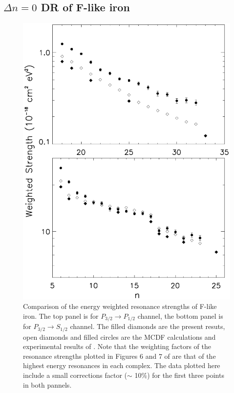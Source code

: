\documentclass{elsart}
\begin{document}
\subsection{$\Delta n = 0$ DR of F-like iron}
\begin{figure}
\includegraphics[width=5in]{str.eps}
\caption{\label{fig_str} Comparison of the energy weighted resonance
strengths of F-like iron. The top panel is for $P_{3/2}\to P_{1/2}$ channel,
the bottom 
panel is for $P_{3/2}\to S_{1/2}$ channel. The filled diamonds are the present
resuts, open diamonds and filled circles are the MCDF calculations and
experimental results of \citet{savin99}. Note that the weighting factors of
the resonance strengths plotted in Figures 6 and 7 of \citet{savin99} are that
of the highest energy resonances in each complex. The data plotted here
include a small corrections factor ($\sim$ 10\%) for the first three points in
both pannels.}
\end{figure}
\end{document}
